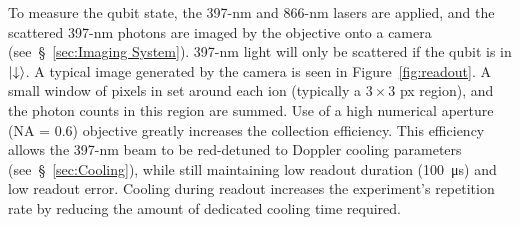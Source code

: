     To measure the qubit state, the 397-nm and 866-nm lasers
    are applied, and the scattered 397-nm photons are imaged by the objective onto a camera (see~\S~\ref{sec:Imaging System}). 397-nm light will only be scattered if the qubit is in $\ket{\downarrow}$.
    A typical image generated by the camera is seen in Figure~\ref{fig:readout}. A small window of pixels in set around each ion (typically a $3\times3$ px region), and the photon counts in this region are summed.  
    Use of a high numerical aperture (NA = 0.6) objective greatly increases the collection efficiency.
    This efficiency allows the 397-nm beam to be red-detuned to Doppler cooling parameters (see~\S~\ref{sec:Cooling}), while still maintaining low readout duration (100~\unit{\us}) and low readout error. 
    Cooling during readout increases the experiment's repetition rate by reducing the amount of dedicated cooling time required.

